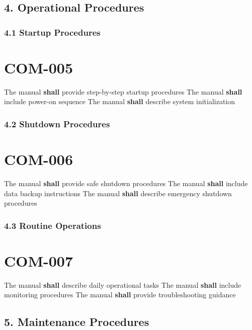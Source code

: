\subsection{4. Operational Procedures}

\subsubsection{4.1 Startup Procedures}

\section{COM-005}\label{COM-005}

The manual \textbf{shall} provide step-by-step startup procedures
The manual \textbf{shall} include power-on sequence
The manual \textbf{shall} describe system initialization

\subsubsection{4.2 Shutdown Procedures}

\section{COM-006}\label{COM-006}

The manual \textbf{shall} provide safe shutdown procedures
The manual \textbf{shall} include data backup instructions
The manual \textbf{shall} describe emergency shutdown procedures

\subsubsection{4.3 Routine Operations}

\section{COM-007}\label{COM-007}

The manual \textbf{shall} describe daily operational tasks
The manual \textbf{shall} include monitoring procedures
The manual \textbf{shall} provide troubleshooting guidance

\subsection{5. Maintenance Procedures}

